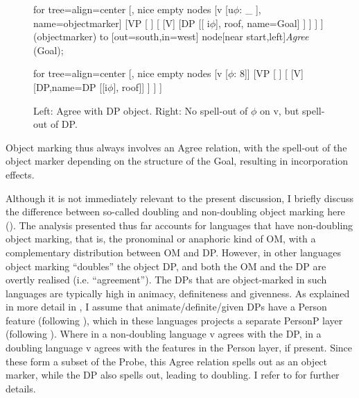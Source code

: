 \documentclass[output=paper
,modfonts
,nonflat]{langsci/langscibook}
\begin{document}
\begin{figure} 
	\caption{Left: Agree with DP object\label{fig-vdwal:14}. Right: No spell-out of $\phi$ on v, but spell-out of DP.\label{fig-vdwal:15}}
	\begin{minipage}{.5\textwidth}\centering
		\begin{forest} for tree={align=center}
			[, nice empty nodes
			[v {[}u$\phi$: \_ {]}, name=objectmarker]
			[VP [ ]
			[
			[V]  
			[DP [{[} i$\phi${]}, roof, name=Goal] ]
			] ] ]				
			 (objectmarker) to [out=south,in=west] node[near start,left]{\textit{Agree}} (Goal);			
	\end{forest}
	\end{minipage}\begin{minipage}{.5\textwidth}\centering
		\begin{forest} for tree={align=center}
			[, nice empty nodes
			[v {[}$\phi$: 8{]}] 
			[VP [ ]
			[
			[V]  
			[DP,name=DP [{[}i$\phi${]}, roof]]
			] ] ]				
	\end{forest}
	\end{minipage}
\end{figure}

Object marking thus always involves an Agree relation, with the spell-out of the object marker depending on the structure of the Goal, resulting in incorporation effects.

Although it is not immediately relevant to the present discussion, I briefly discuss the difference between so-called doubling and non-doubling object marking here (). The analysis presented thus far accounts for languages that have non-doubling object marking, that is, the pronominal or anaphoric kind of OM, with a complementary distribution between OM and DP. However, in other languages object marking ``doubles'' the object DP, and both the OM and the DP are overtly realised (i.e. ``agreement''). The DPs that are object-marked in such languages are typically high in animacy, definiteness and givenness. As explained in more detail in \citet{Van_der_Wal2015}, I assume that animate/definite/given DPs have a Person feature (following \citealt{Richards2008, Richards2015}), which in these languages projects a separate PersonP layer (following \citealt{Hoehn2017}).  
Where in a non-doubling language v agrees with the DP, in a doubling language v agrees with the features in the Person layer, if present. Since these form a subset of the Probe, this Agree relation spells out as an object marker, while the DP also spells out, leading to doubling. I refer to \citet{Van_der_Wal2015} for further details.
\end{document}
